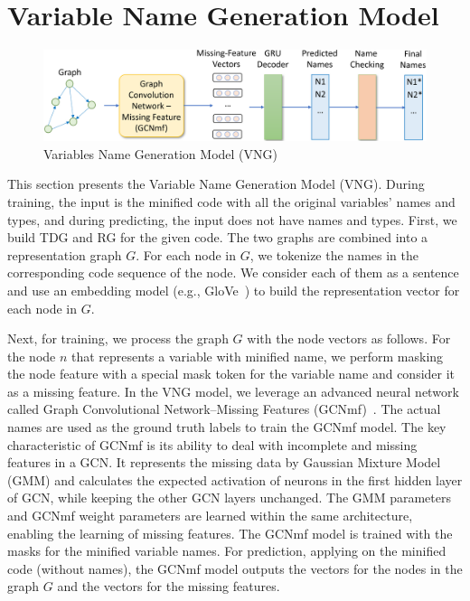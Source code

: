 \section{Variable Name Generation Model}
\label{sec:name-gen}

\begin{figure}[t]
	\begin{center}
	  \includegraphics[width=4.8in]{figures/name-gen-model-2}
          \vspace{-6pt}
		\caption{Variables Name Generation Model (VNG)}
		\label{fig:name-gen}
	\end{center}
\end{figure}



This section presents the Variable Name Generation Model (VNG).
During training, the input is the minified code with all the original
variables' names and types, and during predicting, the input does not
have names and types. First, we build TDG and RG for the given
code. The two graphs are combined into a representation
graph $G$. For each node in $G$, we tokenize the names in the
corresponding code sequence of the node. We consider each of them as a
sentence and use an embedding model (e.g.,
GloVe~\cite{pennington2014glove}) to build the representation vector
for each node in $G$.

Next, for training, we process the graph $G$ with the node vectors as
follows. For the node $n$ that represents a variable with minified
name, we perform masking the node feature with a special mask token
for the variable name and consider it as a missing feature. In the VNG
model, we leverage an advanced neural network called Graph
Convolutional Network--Missing Features (GCNmf)~\cite{GCNmf}.  The
actual names are used as the ground truth labels to train the GCNmf
model. The key characteristic of GCNmf is its ability to deal with
incomplete and missing features in a GCN. It represents the missing
data by Gaussian Mixture Model (GMM) and calculates the expected
activation of neurons in the first hidden layer of GCN, while keeping
the other GCN layers unchanged. The GMM parameters and GCNmf weight
parameters are learned within the same architecture, enabling the
learning of missing features. The GCNmf model is trained with the
masks for the minified variable names. For prediction, applying on the
minified code (without names), the GCNmf model outputs the vectors for
the nodes in the graph $G$ and the vectors for the missing features.

